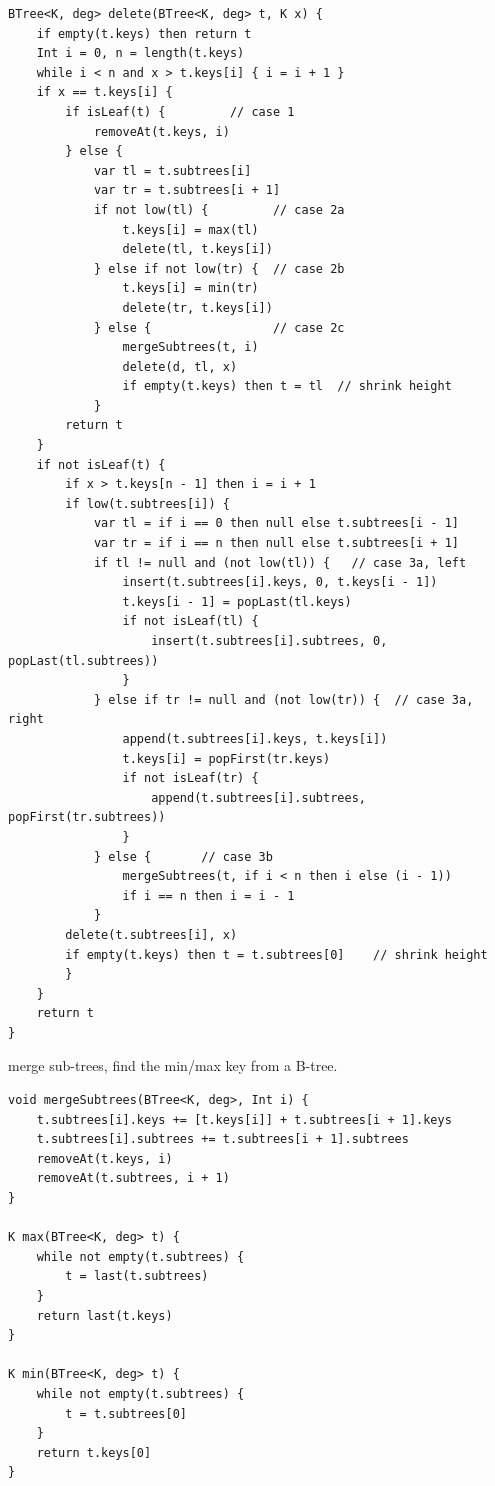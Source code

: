 \documentclass[b5paper]{article}
\begin{document}
\begin{lstlisting}[language = Bourbaki]
BTree<K, deg> delete(BTree<K, deg> t, K x) {
    if empty(t.keys) then return t
    Int i = 0, n = length(t.keys)
    while i < n and x > t.keys[i] { i = i + 1 }
    if x == t.keys[i] {
        if isLeaf(t) {         // case 1
            removeAt(t.keys, i)
        } else {
            var tl = t.subtrees[i]
            var tr = t.subtrees[i + 1]
            if not low(tl) {         // case 2a
                t.keys[i] = max(tl)
                delete(tl, t.keys[i])
            } else if not low(tr) {  // case 2b
                t.keys[i] = min(tr)
                delete(tr, t.keys[i])
            } else {                 // case 2c
                mergeSubtrees(t, i)
                delete(d, tl, x)
                if empty(t.keys) then t = tl  // shrink height
            }
        return t
    }
    if not isLeaf(t) {
        if x > t.keys[n - 1] then i = i + 1
        if low(t.subtrees[i]) {
            var tl = if i == 0 then null else t.subtrees[i - 1]
            var tr = if i == n then null else t.subtrees[i + 1]
            if tl != null and (not low(tl)) {   // case 3a, left
                insert(t.subtrees[i].keys, 0, t.keys[i - 1])
                t.keys[i - 1] = popLast(tl.keys)
                if not isLeaf(tl) {
                    insert(t.subtrees[i].subtrees, 0, popLast(tl.subtrees))
                }
            } else if tr != null and (not low(tr)) {  // case 3a, right
                append(t.subtrees[i].keys, t.keys[i])
                t.keys[i] = popFirst(tr.keys)
                if not isLeaf(tr) {
                    append(t.subtrees[i].subtrees, popFirst(tr.subtrees))
                }
            } else {       // case 3b
                mergeSubtrees(t, if i < n then i else (i - 1))
                if i == n then i = i - 1
            }
        delete(t.subtrees[i], x)
        if empty(t.keys) then t = t.subtrees[0]    // shrink height
        }
    }
    return t
}
\end{lstlisting}

merge sub-trees, find the min/max key from a B-tree.

\begin{lstlisting}[language = Bourbaki]
void mergeSubtrees(BTree<K, deg>, Int i) {
    t.subtrees[i].keys += [t.keys[i]] + t.subtrees[i + 1].keys
    t.subtrees[i].subtrees += t.subtrees[i + 1].subtrees
    removeAt(t.keys, i)
    removeAt(t.subtrees, i + 1)
}

K max(BTree<K, deg> t) {
    while not empty(t.subtrees) {
        t = last(t.subtrees)
    }
    return last(t.keys)
}

K min(BTree<K, deg> t) {
    while not empty(t.subtrees) {
        t = t.subtrees[0]
    }
    return t.keys[0]
}
\end{lstlisting}
\end{document}
